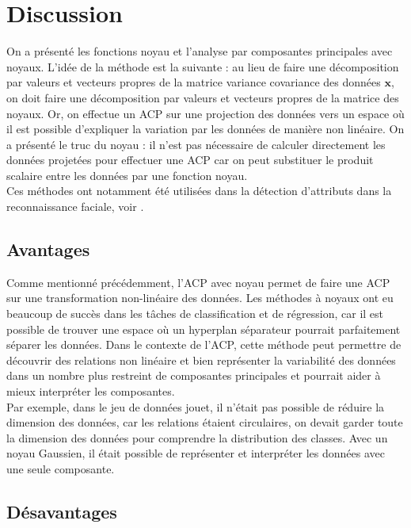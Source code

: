 \section{Discussion}

On a présenté les fonctions noyau et l'analyse par composantes principales avec noyaux. L'idée de la méthode est la suivante : au lieu de faire une décomposition par valeurs et vecteurs propres de la matrice variance covariance des données $\textbf{x}$, on doit faire une décomposition par valeurs et vecteurs propres de la matrice des noyaux. Or, on effectue un ACP sur une projection des données vers un espace où il est possible d'expliquer la variation par les données de manière non linéaire. On a présenté le truc du noyau : il n'est pas nécessaire de calculer directement les données projetées pour effectuer une ACP car on peut substituer le produit scalaire entre les données par une fonction noyau. \\

Ces méthodes ont notamment été utilisées dans la détection d'attributs dans la reconnaissance faciale, voir \cite{kim2002face}. 

\subsection{Avantages}

Comme mentionné précédemment, l'ACP avec noyau permet de faire une ACP sur une transformation non-linéaire des données. Les méthodes à noyaux ont eu beaucoup de succès dans les tâches de classification et de régression, car il est possible de trouver une espace où un hyperplan séparateur pourrait parfaitement séparer les données. Dans le contexte de l'ACP, cette méthode peut permettre de découvrir des relations non linéaire et bien représenter la variabilité des données dans un nombre plus restreint de composantes principales et pourrait aider à mieux interpréter les composantes. \\

Par exemple, dans le jeu de données jouet, il n'était pas possible de réduire la dimension des données, car les relations étaient circulaires, on devait garder toute la dimension des données pour comprendre la distribution des classes. Avec un noyau Gaussien, il était possible de représenter et interpréter les données avec une seule composante.

\subsection{Désavantages}


